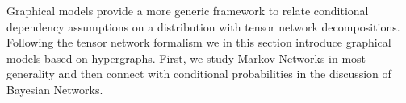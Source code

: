 %
%

















Graphical models provide a more generic framework to relate conditional dependency assumptions on a distribution with tensor network decompositions.
Following the tensor network formalism we in this section introduce graphical models based on hypergraphs.
First, we study Markov Networks in most generality and then connect with conditional probabilities in the discussion of Bayesian Networks.

